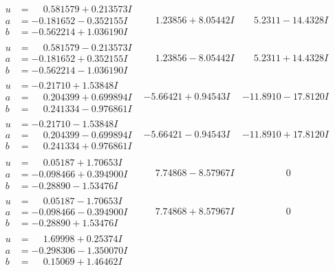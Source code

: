 \documentclass[1p]{elsarticle_modified}
\theoremstyle{definition}
\begin{document}
$$\begin{array}{c|c|c}
\begin{aligned}
u &= \phantom{-}0.581579 + 0.213573 I \\
a &= -0.181652 - 0.352155 I \\
b &= -0.562214 + 1.036190 I\end{aligned}
 & \phantom{-}1.23856 + 8.05442 I & \phantom{-}5.2311 - 14.4328 I \\ \hline\begin{aligned}
u &= \phantom{-}0.581579 - 0.213573 I \\
a &= -0.181652 + 0.352155 I \\
b &= -0.562214 - 1.036190 I\end{aligned}
 & \phantom{-}1.23856 - 8.05442 I & \phantom{-}5.2311 + 14.4328 I \\ \hline\begin{aligned}
u &= -0.21710 + 1.53848 I \\
a &= \phantom{-}0.204399 + 0.699894 I \\
b &= \phantom{-}0.241334 - 0.976861 I\end{aligned}
 & -5.66421 + 0.94543 I & -11.8910 - 17.8120 I \\ \hline\begin{aligned}
u &= -0.21710 - 1.53848 I \\
a &= \phantom{-}0.204399 - 0.699894 I \\
b &= \phantom{-}0.241334 + 0.976861 I\end{aligned}
 & -5.66421 - 0.94543 I & -11.8910 + 17.8120 I \\ \hline\begin{aligned}
u &= \phantom{-}0.05187 + 1.70653 I \\
a &= -0.098466 + 0.394900 I \\
b &= -0.28890 - 1.53476 I\end{aligned}
 & \phantom{-}7.74868 - 8.57967 I & \phantom{-0.000000 } 0 \\ \hline\begin{aligned}
u &= \phantom{-}0.05187 - 1.70653 I \\
a &= -0.098466 - 0.394900 I \\
b &= -0.28890 + 1.53476 I\end{aligned}
 & \phantom{-}7.74868 + 8.57967 I & \phantom{-0.000000 } 0 \\ \hline\begin{aligned}
u &= \phantom{-}1.69998 + 0.25374 I \\
a &= -0.298306 - 1.350070 I \\
b &= \phantom{-}0.15069 + 1.46462 I\end{aligned}

\end{array}$$
\end{document}
